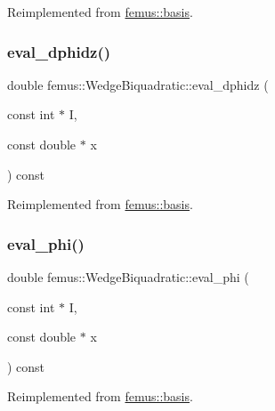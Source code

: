 Reimplemented from \mbox{\hyperlink{classfemus_1_1basis_a2819fac9aae797156b9efec8a0b85cc1}{femus\+::basis}}.

\mbox{\label{classfemus_1_1_wedge_biquadratic_a1aa59bba6892b349afc89f427266e30b}} 
\subsubsection{\texorpdfstring{eval\+\_\+dphidz()}{eval\_dphidz()}}
{\footnotesize\ttfamily double femus\+::\+Wedge\+Biquadratic\+::eval\+\_\+dphidz (\begin{DoxyParamCaption}\item[{const int $\ast$}]{I,  }\item[{const double $\ast$}]{x }\end{DoxyParamCaption}) const\hspace{0.3cm}{\ttfamily [virtual]}}



Reimplemented from \mbox{\hyperlink{classfemus_1_1basis_affd9927f6e25e264108219d862b8cb3d}{femus\+::basis}}.

\mbox{\label{classfemus_1_1_wedge_biquadratic_ae552733ed0284e76d8cd13e3b9b02b7f}} 
\subsubsection{\texorpdfstring{eval\+\_\+phi()}{eval\_phi()}}
{\footnotesize\ttfamily double femus\+::\+Wedge\+Biquadratic\+::eval\+\_\+phi (\begin{DoxyParamCaption}\item[{const int $\ast$}]{I,  }\item[{const double $\ast$}]{x }\end{DoxyParamCaption}) const\hspace{0.3cm}{\ttfamily [virtual]}}



Reimplemented from \mbox{\hyperlink{classfemus_1_1basis_a89b0797cdccffae5ff6d059b32016ae5}{femus\+::basis}}.

